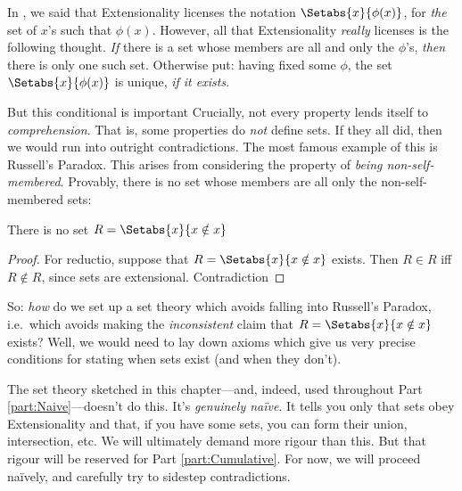 \documentclass[../../../include/open-logic-section]{subfiles}
\begin{document}
\begin{explain}
In , we said that Extensionality licenses the notation $\Setabs{x}{\phi(x)}$, for \emph{the} set of $x$'s such that $\phi(x)$. However, all that Extensionality \emph{really} licenses is the following thought. \emph{If} there is a set whose members are all and only the $\phi$'s, \emph{then} there is only one such set. Otherwise put: having fixed some $\phi$, the set $\Setabs{x}{\phi(x)}$ is unique, \emph{if it exists}.

But this conditional is important\bang{} Crucially, not every property lends itself to \emph{comprehension}. That is, some  properties do \emph{not} define sets. If they all did, then we would run into
outright contradictions. The most famous example of this is Russell's
Paradox. This arises from considering the property of \emph{being non-self-membered}. Provably, there is no set whose members are all only the non-self-membered sets:
\end{explain}
\begin{thm}
	There is no set $R = \Setabs{x}{x \notin x}$
\end{thm}
\begin{proof}
	For reductio, suppose that $R = \Setabs{x}{x \notin x}$ exists. Then $R \in R$ iff $R \notin R$, since sets are extensional. Contradiction\bang
\end{proof}
\begin{explain}
So: \emph{how} do we set up a set theory which avoids falling into Russell's Paradox, i.e.\ which avoids making the \emph{inconsistent} claim that $R = \Setabs{x}{x \notin x}$ exists? Well, we would need to lay down axioms which give us very precise conditions for stating when sets exist (and when they don't). 
	
The set theory sketched in this chapter---and, indeed, used throughout Part \ref{part:Naive}---doesn't do this. It's \emph{genuinely na\"ive}. It tells you only that sets obey Extensionality and that, if you have some sets, you can form their union, intersection, etc. We will ultimately demand more rigour than this. But that rigour will be reserved for Part \ref{part:Cumulative}. For now, we will proceed na\"ively, and carefully try to sidestep contradictions.  
\end{explain}
\end{document}
